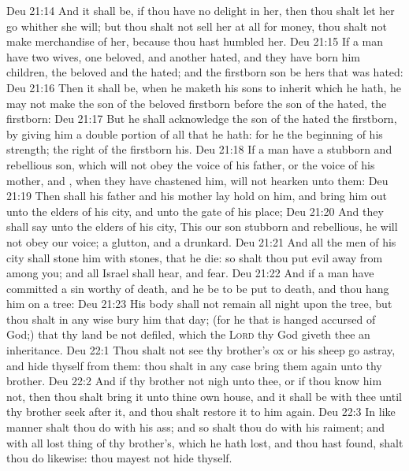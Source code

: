 \vs Deu 21:14 And it shall be, if thou have no delight in her, then thou shalt let her go whither she will; but thou shalt not sell her at all for money, thou shalt not make merchandise of her, because thou hast humbled her.
\vs Deu 21:15 If a man have two wives, one beloved, and another hated, and they have born him children,  the beloved and the hated; and  the firstborn son be hers that was hated:
\vs Deu 21:16 Then it shall be, when he maketh his sons to inherit  which he hath,  he may not make the son of the beloved firstborn before the son of the hated,  the firstborn:
\vs Deu 21:17 But he shall acknowledge the son of the hated  the firstborn, by giving him a double portion of all that he hath: for he  the beginning of his strength; the right of the firstborn  his.
\vs Deu 21:18 If a man have a stubborn and rebellious son, which will not obey the voice of his father, or the voice of his mother, and , when they have chastened him, will not hearken unto them:
\vs Deu 21:19 Then shall his father and his mother lay hold on him, and bring him out unto the elders of his city, and unto the gate of his place;
\vs Deu 21:20 And they shall say unto the elders of his city, This our son  stubborn and rebellious, he will not obey our voice;  a glutton, and a drunkard.
\vs Deu 21:21 And all the men of his city shall stone him with stones, that he die: so shalt thou put evil away from among you; and all Israel shall hear, and fear.
\vs Deu 21:22 And if a man have committed a sin worthy of death, and he be to be put to death, and thou hang him on a tree:
\vs Deu 21:23 His body shall not remain all night upon the tree, but thou shalt in any wise bury him that day; (for he that is hanged  accursed of God;) that thy land be not defiled, which the \textsc{Lord} thy God giveth thee  an inheritance.
\vs Deu 22:1 Thou shalt not see thy brother's ox or his sheep go astray, and hide thyself from them: thou shalt in any case bring them again unto thy brother.
\vs Deu 22:2 And if thy brother  not nigh unto thee, or if thou know him not, then thou shalt bring it unto thine own house, and it shall be with thee until thy brother seek after it, and thou shalt restore it to him again.
\vs Deu 22:3 In like manner shalt thou do with his ass; and so shalt thou do with his raiment; and with all lost thing of thy brother's, which he hath lost, and thou hast found, shalt thou do likewise: thou mayest not hide thyself.
